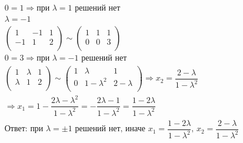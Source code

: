 \documentclass[12pt]{article}
\begin{document}
\begin{sloppypar}
\[\begin{array}{l}
            0 = 1 \Rightarrow \text{при $\lambda=1$ решений нет}                                                                                            \\
            \lambda=-1                                                                                                                                      \\
            \begin{pmatrix}
                1  & -1 & 1 \\
                -1 & 1  & 2 \\
            \end{pmatrix}
            \sim
            \begin{pmatrix}
                1 & 1 & 1 \\
                0 & 0 & 3 \\
            \end{pmatrix}                                                                                                                                  \\
            0 = 3 \Rightarrow \text{при $\lambda=-1$ решений нет}                                                                                           \\
            \begin{pmatrix}
                1       & \lambda & 1 \\
                \lambda & 1       & 2 \\
            \end{pmatrix}
            \sim
            \begin{pmatrix}
                1 & \lambda       & 1           \\
                0 & 1 - \lambda^2 & 2 - \lambda \\
            \end{pmatrix}
            \Rightarrow x_2 = \dfrac{2 - \lambda}{1 - \lambda^2}                                                                                            \\
            \Rightarrow x_1 = 1 - \dfrac{2\lambda - \lambda^2}{1 - \lambda^2} = - \dfrac{2\lambda - 1}{1 - \lambda^2} = \dfrac{1 - 2\lambda}{1 - \lambda^2} \\
            \text{Ответ: при $\lambda = \pm1$ решений нет, иначе  $x_1 = \dfrac{1 - 2\lambda}{1 - \lambda^2}$, $x_2 = \dfrac{2 - \lambda}{1 - \lambda^2}$}
        \end{array}
    \]


\end{sloppypar}
\end{document}
